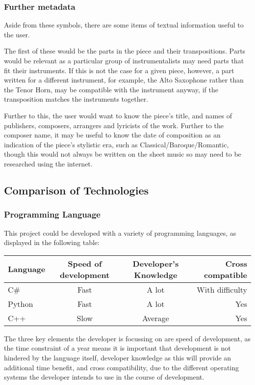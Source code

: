 \subsubsection{Further metadata}
Aside from these symbols, there are some items of textual information useful to the user. 

The first of these would be the parts in the piece and their transpositions. Parts would be relevant as a particular group of instrumentalists may need parts that fit their instruments. If this is not the case for a given piece, however, a part written for a different instrument, for example, the Alto Saxophone rather than the Tenor Horn, may be compatible with the instrument anyway, if the transposition matches the instruments together.

Further to this, the user would want to know the piece's title, and names of publishers, composers, arrangers and lyricists of the work. Further to the composer name, it may be useful to know the date of composition as an indication of the piece's stylistic era, such as Classical/Baroque/Romantic, though this would not always be written on the sheet music so may need to be researched using the internet.


\subsection{Comparison of Technologies}
\subsubsection{Programming Language}
This project could be developed with a variety of programming languages, as displayed in the following table:

\begin{center}
\begin{tabular}{| l | c | c | r |} \hline
  {Language} & {Speed of development} & {Developer's Knowledge} & {Cross compatible} \\ \hline
  C\# & Fast & A lot & With difficulty \\ \hline
  Python & Fast & A lot & Yes \\ \hline
  C++ & Slow & Average & Yes \\ \hline
\end{tabular}
\end{center}
The three key elements the developer is focussing on are speed of development, as the time constraint of a year means it is important that development is not hindered by the language itself, developer knowledge as this will provide an additional time benefit, and cross compatibility, due to the different operating systems the developer intends to use in the course of development.

